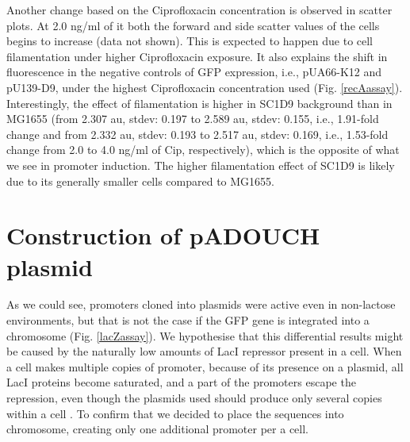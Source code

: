 Another change based on the Ciprofloxacin concentration is observed in scatter plots.
At 2.0 ng/ml of it both the forward and side scatter values of the cells begins to increase (data not shown).
This is expected to happen due to cell filamentation under higher Ciprofloxacin exposure.
It also explains the shift in fluorescence in the negative controls of GFP expression, i.e., pUA66-K12 and pU139-D9, under the highest Ciprofloxacin concentration used (Fig. \ref{recAassay}).
Interestingly, the effect of filamentation is higher in SC1\textunderscore D9 background than in MG1655 (from 2.307 au, stdev: 0.197 to 2.589 au, stdev: 0.155, i.e., 1.91-fold change and from 2.332 au, stdev: 0.193 to 2.517 au, stdev: 0.169, i.e., 1.53-fold change from 2.0 to 4.0 ng/ml of Cip, respectively), which is the opposite of what we see in  promoter induction.
The higher filamentation effect of SC1\textunderscore D9 is likely due to its generally smaller cells compared to MG1655.


\section{Construction of pADOUCH plasmid}
As we could see,  promoters cloned into plasmids were active even in non-lactose environments, but that is not the case if the GFP gene is integrated into a chromosome (Fig. \ref{lacZassay}).
We hypothesise that this differential results might be caused by the naturally low amounts of LacI repressor present in a cell.
When a cell makes multiple copies of  promoter, because of its presence on a plasmid, all LacI proteins become saturated, and a part of the promoters escape the repression, even though the plasmids used should produce only several copies within a cell \cite{zaslaver2006comprehensive}.
To confirm that we decided to place the  sequences into chromosome, creating only one additional  promoter per a cell.

